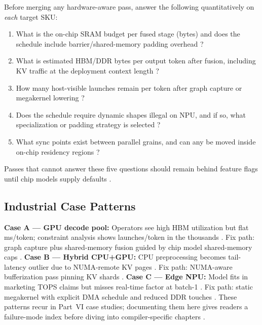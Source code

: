 Before merging any hardware-aware pass, answer the following quantitatively on \emph{each} target SKU:
\begin{enumerate}
\item What is the on-chip SRAM budget per fused stage (bytes) and does the schedule include barrier/shared-memory padding overhead \citep{nvidia2022hopper,amd2024aie}?
\item What is estimated HBM/DDR bytes per output token after fusion, including KV traffic at the deployment context length \citep{patel2025llminference,memoryfloor2026}?
\item How many host-visible launches remain per token after graph capture or megakernel lowering \citep{taxbreak2026,nvidia2024cudagraphs}?
\item Does the schedule require dynamic shapes illegal on NPU, and if so, what specialization or padding strategy is selected \citep{amd2024xdna,kwon2023vllm}?
\item What sync points exist between parallel grains, and can any be moved inside on-chip residency regions \citep{patel2025llminference,amd2024xdna}?
\end{enumerate}
Passes that cannot answer these five questions should remain behind feature flags until chip models supply defaults \citep{memoryfloor2026,dlbook}.

\subsection{Industrial Case Patterns}
\label{sec:ch03_case_patterns}

\textbf{Case A — GPU decode pool:} Operators see high HBM utilization but flat ms/token; constraint analysis shows launches/token in the thousands \citep{taxbreak2026}.
Fix path: graph capture plus shared-memory fusion guided by chip model shared-memory caps \citep{nvidia2024cudagraphs,nvidia2022hopper}.
\textbf{Case B — Hybrid CPU+GPU:} CPU preprocessing becomes tail-latency outlier due to NUMA-remote KV pages \citep{patel2025llminference}.
Fix path: NUMA-aware bufferization pass pinning KV shards \citep{dlbook}.
\textbf{Case C — Edge NPU:} Model fits in marketing TOPS claims but misses real-time factor at batch-1 \citep{amd2024xdna,memoryfloor2026}.
Fix path: static megakernel with explicit DMA schedule and reduced DDR touches \citep{amd2024aie,amd2024xdna}.
These patterns recur in Part~VI case studies; documenting them here gives readers a failure-mode index before diving into compiler-specific chapters \citep{patel2025llminference,liu2024deepseekv3}.

